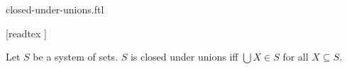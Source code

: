 \documentclass{article}
\begin{document}
\begin{smodule}{closed-under-unions.ftl}
  \begin{forthel}
    [readtex ]
  \end{forthel}

  \begin{fdefinition*}
    Let $S$ be a system of sets.
    $S$ is closed under unions iff $\bigcup X \in S$ for all $X \subseteq S$.
  \end{fdefinition*}
\end{smodule}
\end{document}
